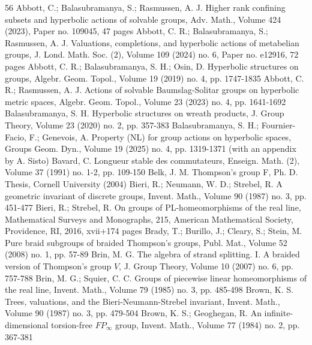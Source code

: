 \documentclass[10pt,a4paper]{article}
\theoremstyle{definition}
\theoremstyle{remark}
\theoremstyle{plain}
\begin{document}
\begin{thebibliography}{56}
Abbott, C.; Balasubramanya, S.; Rasmussen, A. J. Higher rank confining subsets and hyperbolic actions of solvable groups, Adv. Math., Volume 424 (2023), Paper no. 109045, 47 pages
Abbott, C. R.; Balasubramanya, S.; Rasmussen, A. J. Valuations, completions, and hyperbolic actions of metabelian groups, J. Lond. Math. Soc. (2), Volume 109 (2024) no. 6, Paper no. e12916, 72 pages
Abbott, C. R.; Balasubramanya, S. H.; Osin, D. Hyperbolic structures on groups, Algebr. Geom. Topol., Volume 19 (2019) no. 4, pp. 1747-1835
Abbott, C. R.; Rasmussen, A. J. Actions of solvable Baumslag-Solitar groups on hyperbolic metric spaces, Algebr. Geom. Topol., Volume 23 (2023) no. 4, pp. 1641-1692
Balasubramanya, S. H. Hyperbolic structures on wreath products, J. Group Theory, Volume 23 (2020) no. 2, pp. 357-383
Balasubramanya, S. H.; Fournier-Facio, F.; Genevois, A. Property (NL) for group actions on hyperbolic spaces, Groups Geom. Dyn., Volume 19 (2025) no. 4, pp. 1319-1371 (with an appendix by A. Sisto)
Bavard, C. Longueur stable des commutateurs, Enseign. Math. (2), Volume 37 (1991) no. 1-2, pp. 109-150
Belk, J. M. Thompson’s group F, Ph. D. Thesis, Cornell University (2004)
Bieri, R.; Neumann, W. D.; Strebel, R. A geometric invariant of discrete groups, Invent. Math., Volume 90 (1987) no. 3, pp. 451-477
Bieri, R.; Strebel, R. On groups of PL-homeomorphisms of the real line, Mathematical Surveys and Monographs, 215, American Mathematical Society, Providence, RI, 2016, xvii+174 pages
Brady, T.; Burillo, J.; Cleary, S.; Stein, M. Pure braid subgroups of braided Thompson’s groups, Publ. Mat., Volume 52 (2008) no. 1, pp. 57-89
Brin, M. G. The algebra of strand splitting. I. A braided version of Thompson’s group ${V}$, J. Group Theory, Volume 10 (2007) no. 6, pp. 757-788
Brin, M. G.; Squier, C. C. Groups of piecewise linear homeomorphisms of the real line, Invent. Math., Volume 79 (1985) no. 3, pp. 485-498
Brown, K. S. Trees, valuations, and the Bieri-Neumann-Strebel invariant, Invent. Math., Volume 90 (1987) no. 3, pp. 479-504
Brown, K. S.; Geoghegan, R. An infinite-dimensional torsion-free ${FP}_\infty $ group, Invent. Math., Volume 77 (1984) no. 2, pp. 367-381

\end{thebibliography}
\end{document}
